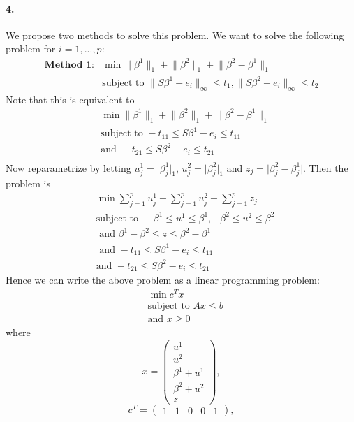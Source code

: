 \documentclass[12pt, leqno]{article}
\providecommand{\abs}[1]{\lvert#1\rvert}
\providecommand{\norm}[1]{\lVert#1\rVert}
\begin{document}
\paragraph{4.} We propose two methods to solve this problem.
We want to solve the following problem for $i = 1,...,p$:
\begin{align*} \textbf{Method 1:}
&\min \norm{\beta^{1}}_1 + \norm{\beta^{2}}_1 + \norm{\beta^{2} -\beta^{1}}_1\\
&\text{subject to } \norm{S\beta^{1} - e_i}_{\infty} \leq t_1 ,
  \norm{S\beta^{2} - e_i}_{\infty} \leq t_2 
\end{align*}
Note that this is equivalent to
\begin{align*}
&\min \norm{\beta^{1}}_1 + \norm{\beta^{2}}_1 + \norm{\beta^{2} -\beta^{1}}_1\\
&\text{subject to } - t_11 \leq S\beta^{1} - e_i\leq t_11 \\
&\text{and }  -t_21 \leq S\beta^{2} - e_i \leq t_21 \\
\end{align*}
Now reparametrize by letting $u_j^1 = \abs{\beta_j^{1}}_1$, $u_j^2 =
\abs{\beta_j^{2}}_1$ and $z_j = \abs{\beta_j^2 - \beta_j^1}$. Then the problem is 
\begin{align*}
&\min \sum_{j = 1}^p{u_j^1} +  \sum_{j = 1}^p{u_j^2} + \sum_{j = 1}^p{z_j} \\
&\text{subject to } -\beta^{1} \leq u^1 \leq \beta^{1},-\beta^{2} \leq
  u^2 \leq \beta^{2} \\
&\text{ and } \beta^{1}-\beta^{2} \leq z \leq \beta^{2} - \beta^{1}\\
&\text{ and } - t_11 \leq S\beta^{1} - e_i\leq t_11 \\
&\text{and }  -t_21 \leq S\beta^{2} - e_i \leq t_21 
\end{align*}
Hence we can write the above problem as a linear programming problem:
\begin{align*}
&\min c^Tx \\
&\text{subject to } Ax \leq b \\
&\text{and } x \geq 0
\end{align*}
where 
\[
x = \begin{pmatrix} u^1 \\u^2 \\\beta^{1} + u^1 \\ \beta^{2} + u^2 \\z \end{pmatrix},
\]
\[
c^T = \begin{pmatrix} 1 &1&0&0&1 \end{pmatrix},
\]
\end{document}
